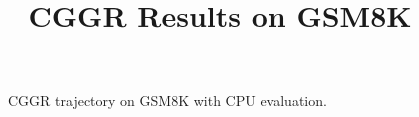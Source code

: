 \documentclass{article}
\title{CGGR Results on GSM8K}
\begin{document}
\begin{figure}
\caption{CGGR trajectory on GSM8K with CPU evaluation.}
\end{figure}
\end{document}
